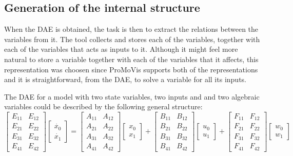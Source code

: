 \subsection{Generation of the internal structure}
When the DAE is obtained, the task is then to extract the relations between the variables from it. The tool collects and stores each of the variables, together with each of the variables that acts as inputs to it. Although it might feel more natural to store a variable together with each of the variables that it affects, this representation was choosen since ProMoVis supports both of the representations and it is straightforward, from the DAE, to solve a variable for all its inputs.
\begin{mydef}
The DAE for a model with two state variables, two inputs and and two algebraic variables could be described by the following general structure:
%
\begin{equation}\begin{bmatrix} E_{11} & E_{12} \\ E_{21} & E_{22} \\ E_{31} & E_{32} \\ E_{41} & E_{42} \end{bmatrix} \left[ \begin{array}{c} \dot{x_0} \\ \dot{x_1} \end{array} \right] = \begin{bmatrix} A_{11} & A_{12} \\ A_{21} & A_{22} \\ A_{31} & A_{32} \\ A_{41} & A_{42} \end{bmatrix} \left[ \begin{array}{c} x_0 \\ x_1 \end{array} \right] + \begin{bmatrix} B_{11} & B_{12} \\ B_{21} & B_{22} \\ B_{31} & B_{32} \\ B_{41} & B_{42} \end{bmatrix} \left[ \begin{array}{c} u_0 \\ u_1 \end{array} \right]+\begin{bmatrix} F_{11} & F_{12} \\ F_{21} & F_{22} \\ F_{31} & F_{32} \\ F_{41} & F_{42}\end{bmatrix} \left[ \begin{array}{c} w_0 \\ w_1 \end{array} \right]\end{equation}

\end{mydef}
